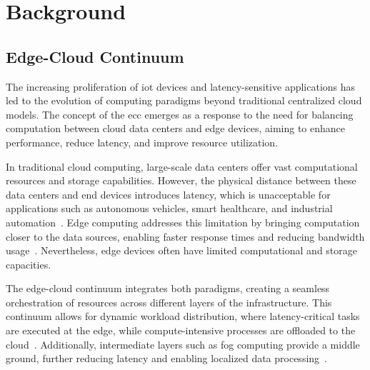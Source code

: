 \documentclass[runningheads]{llncs}
\begin{document}


\section{Background}
\label{sec:background}

\subsection{Edge-Cloud Continuum}
\label{sec:ecc}

The increasing proliferation of \ac{iot} devices and latency-sensitive applications has led to the evolution of computing paradigms beyond traditional centralized cloud models.
%
The concept of the \ac{ecc} emerges as a response to the need for balancing computation between cloud data centers and edge devices,
aiming to enhance performance,
reduce latency,
and improve resource utilization.

In traditional cloud computing,
large-scale data centers offer vast computational resources and storage capabilities.
%
However,
the physical distance between these data centers and end devices introduces latency,
which is unacceptable for applications such as autonomous vehicles,
smart healthcare,
and industrial automation~\cite{DBLP:journals/iotj/ShiCZLX16}.
%
Edge computing addresses this limitation by bringing computation closer to the data sources,
enabling faster response times and reducing bandwidth usage~\cite{DBLP:journals/computer/Satyanarayanan17}.
%
Nevertheless,
edge devices often have limited computational and storage capacities.

The edge-cloud continuum integrates both paradigms,
creating a seamless orchestration of resources across different layers of the infrastructure.
%
This continuum allows for dynamic workload distribution,
where latency-critical tasks are executed at the edge,
while compute-intensive processes are offloaded to the cloud~\cite{DBLP:series/sci/BonomiMNZ14}.
%
Additionally,
intermediate layers such as fog computing provide a middle ground,
further reducing latency and enabling localized data processing~\cite{DBLP:journals/ccr/GonzalezR14}.
\end{document}
